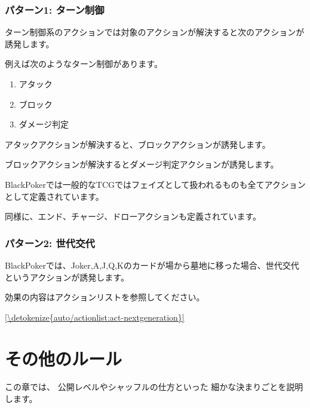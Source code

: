 \documentclass[letterpaper,10pt,dvipdfmx]{sphinxmanual}
\begin{document}
\subsubsection{パターン1: ターン制御}
\label{\detokenize{common/common:id34}}
\sphinxAtStartPar
ターン制御系のアクションでは対象のアクションが解決すると次のアクションが誘発します。

\sphinxAtStartPar
例えば次のようなターン制御があります。
\begin{enumerate}
%
\item {} 
\sphinxAtStartPar
アタック

\item {} 
\sphinxAtStartPar
ブロック

\item {} 
\sphinxAtStartPar
ダメージ判定

\end{enumerate}

\sphinxAtStartPar
アタックアクションが解決すると、ブロックアクションが誘発します。

\sphinxAtStartPar
ブロックアクションが解決するとダメージ判定アクションが誘発します。

\sphinxAtStartPar
BlackPokerでは一般的なTCGではフェイズとして扱われるものも全てアクションとして定義されています。

\sphinxAtStartPar
同様に、エンド、チャージ、ドローアクションも定義されています。


\subsubsection{パターン2: 世代交代}
\label{\detokenize{common/common:id35}}
\sphinxAtStartPar
BlackPokerでは、Joker,A,J,Q,Kのカードが場から墓地に移った場合、世代交代というアクションが誘発します。

\sphinxAtStartPar
効果の内容はアクションリストを参照してください。

\sphinxAtStartPar
\hyperref[\detokenize{auto/actionlist:act-nextgeneration}]{\ref{\detokenize{auto/actionlist:act-nextgeneration}} }


\section{その他のルール}
\label{\detokenize{common/common:id36}}
\sphinxAtStartPar
この章では、
公開レベルやシャッフルの仕方といった
細かな決まりごとを説明します。
\end{document}
